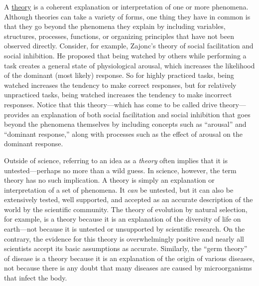 \documentclass[
]{krantz}
\begin{document}
A \hyperref[theory]{theory} is a coherent explanation or interpretation of one or more phenomena. Although theories can take a variety of forms, one thing they have in common is that they go beyond the phenomena they explain by including variables, structures, processes, functions, or organizing principles that have not been observed directly. Consider, for example, Zajonc's theory of social facilitation and social inhibition. He proposed that being watched by others while performing a task creates a general state of physiological arousal, which increases the likelihood of the dominant (most likely) response. So for highly practiced tasks, being watched increases the tendency to make correct responses, but for relatively unpracticed tasks, being watched increases the tendency to make incorrect responses. Notice that this theory---which has come to be called drive theory---provides an explanation of both social facilitation and social inhibition that goes beyond the phenomena themselves by including concepts such as ``arousal'' and ``dominant response,'' along with processes such as the effect of arousal on the dominant response.

Outside of science, referring to an idea as a \emph{theory} often implies that it is untested---perhaps no more than a wild guess. In science, however, the term theory has no such implication. A theory is simply an explanation or interpretation of a set of phenomena. It \emph{can} be untested, but it can also be extensively tested, well supported, and accepted as an accurate description of the world by the scientific community. The theory of evolution by natural selection, for example, is a theory because it is an explanation of the diversity of life on earth---not because it is untested or unsupported by scientific research. On the contrary, the evidence for this theory is overwhelmingly positive and nearly all scientists accept its basic assumptions as accurate. Similarly, the ``germ theory'' of disease is a theory because it is an explanation of the origin of various diseases, not because there is any doubt that many diseases are caused by microorganisms that infect the body.
\end{document}

